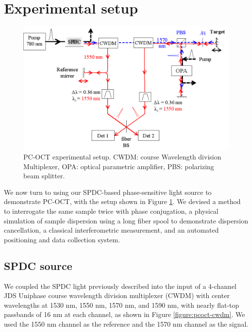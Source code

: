 \section{Experimental setup}

\begin{figure}[t]
\begin{center}
\includegraphics[width=16cm]{figure-pcoct-setup.pdf}
\caption{PC-OCT experimental setup. CWDM: course Wavelength division Multiplexer, OPA: optical parametric amplifier, PBS: polarizing beam splitter.}
\label{figure:pcoct-setup}
\end{center}
\end{figure}

We now turn to using our SPDC-based phase-sensitive light source to demonstrate PC-OCT, with the setup shown in Figure \ref{figure:pcoct-setup}. We devised a method to interrogate the same sample twice with phase conjugation, a physical simulation of sample dispersion using a long fiber spool to demonstrate dispersion cancellation, a classical interferometric measurement, and an automated positioning and data collection system.

\subsection{SPDC source}

We coupled the SPDC light previously described into the input of a 4-channel JDS Uniphase course wavelength division multiplexer (CWDM) with center wavelengths at 1530 nm, 1550 nm, 1570 nm, and 1590 nm, with nearly flat-top passbands of 16 nm at each channel, as shown in Figure \ref{figure:pcoct-cwdm}. We used the 1550 nm channel as the reference and the 1570 nm channel as the signal.

